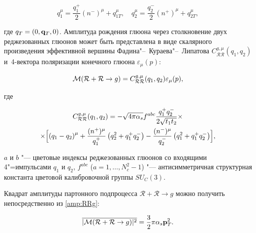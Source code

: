 \begin{equation}

q_1^\mu = \frac{q_1^+}{2}(n^-)^\mu+q_{1T}^\mu , \quad 

q_2^\mu = \frac{q_2^-}{2}(n^+)^\mu+q_{2T}^\mu , 

\end{equation}

где $q_{T}=(0, {\bf q}_{T}, 0)$. Амплитуда рождения глюона через столкновение двух реджезованных глюонов может быть представлена в виде скалярного произведения эффективной вершины Фадина"--~Кураева"--~Липатова $C_{\mathcal{RR}}^{g,\mu}(q_1,q_2)$ и~4-вектора поляризации конечного глюона $\varepsilon_\mu(p)$:

\begin{equation}

{\cal M}(\mathcal{R}+\mathcal{R}\to

g)=C_{\mathcal{RR}}^{g,\mu}(q_1,q_2)\varepsilon_\mu(p),

\end{equation}

где

\begin{multline}\label{amp:RRg}

C_{\mathcal{RR}}^{g,\mu}(q_1,q_2)=-\sqrt{4\pi\alpha_s}f^{abc}

\frac{q_1^+q_2^-}{2\sqrt{t_1t_2}} \times\\

\times 

\Bigl[\left(q_1-q_2\right)^\mu+

\frac{(n^+)^\mu}{q_1^+}\left(q_2^2+q_1^+q_2^- \right)-

\frac{(n^-)^\mu}{q_2^-}\left(q_1^2+q_1^+q_2^-\right)\Bigr],

\end{multline}

$a$ и $b$ "--- цветовые индексы реджезованных глюонов со входящими 4"=импульсами $q_1$ и $q_2$, $f^{abc}$ ($a=1, \dots, N_c^2-1$) "--- антисимметричная структурная константа цветовой калибровочной группы $SU_C(3)$. 

Квадрат амплитуды партонного подпроцесса $\mathcal{R}+\mathcal{R}\to g$ можно получить непосредственно из \eqref{amp:RRg}:

\begin{equation}

\overline{|{\cal M}(\mathcal{R}+\mathcal{R}\to g)|^2}=\frac{3}{2}\pi

\alpha_s \mathbf{p}_T^2. \label{sqamp:RRg}

\end{equation}



